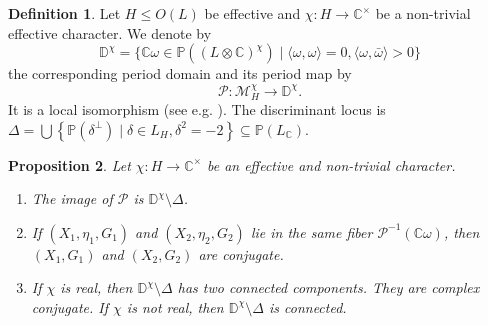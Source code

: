 \documentclass[a4paper]{amsart}
\theoremstyle{definition}
\newtheorem{definition}{Definition}[section]
\theoremstyle{plain}
\newtheorem{proposition}[definition]{Proposition}
\newcommand{\CC}{\mathbb{C}}
\newcommand{\PP}{\mathbb{P}}
\newcommand{\DD}{\mathbb{D}}
\newcommand{\M}{\mathcal{M}}
\renewcommand{\P}{\mathcal{P}}
\newcommand{\sprodb}[2]{\langle #1, #2 \rangle}
\begin{document}
\begin{definition}
 Let $H\leq O(L)$ be effective and $\chi\colon H \to \CC^\times$ be a non-trivial effective character.
 We denote by
 \[\DD^\chi= \{\CC \omega \in \PP((L\otimes \CC)^\chi) \mid \sprodb{\omega}{\omega}=0, \sprodb{\omega}{\bar\omega}>0\}\]
 the corresponding period domain and its period map by
 \[\P \colon \M_H^\chi \to \DD^\chi.\]
It is a local isomorphism (see e.g. \cite{brandhorst-cattaneo}).
The discriminant locus is $\Delta = \bigcup  \left\{\PP(\delta^\perp) \mid \delta \in L_H, \delta^2=-2\right\} \subseteq \PP(L_\CC)$.
\end{definition}

\begin{proposition}\label{perioddomain}
Let $\chi \colon H \to \CC^\times$ be an effective and non-trivial character.
 \begin{enumerate}
  \item The image of $\P$ is $\DD^\chi \setminus \Delta $.
  \item If $(X_1,\eta_1,G_1)$ and $(X_2,\eta_2,G_2)$ lie in the same fiber $\P^{-1}(\CC \omega)$, then $(X_1,G_1)$ and $(X_2,G_2)$ are conjugate.
  \item If $\chi$ is real, then $\DD^\chi \setminus \Delta $ has two connected components. They are complex conjugate. If $\chi$ is not real, then $\DD^\chi \setminus \Delta$ is connected.
 \end{enumerate}
\end{proposition}
\end{document}
